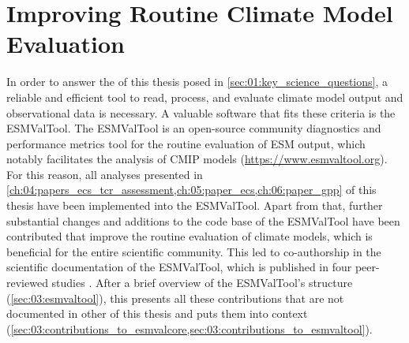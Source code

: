 
%



\chapter{Improving Routine Climate Model Evaluation}
\label{ch:03:esmvaltool}

In order to answer the  of this thesis posed in
\cref{sec:01:key_science_questions}, a reliable and efficient tool to read,
process, and evaluate climate model output and observational data is necessary.
A valuable software that fits these criteria is the \ac{ESMValTool}. The
\ac{ESMValTool} is an open-source community diagnostics and performance metrics
tool for the routine evaluation of \ac{ESM} output, which notably facilitates
the analysis of \ac{CMIP} models (\url{https://www.esmvaltool.org}). For this
reason, all analyses presented in
\cref{ch:04:papers_ecs_tcr_assessment,ch:05:paper_ecs,ch:06:paper_gpp} of this
thesis have been implemented into the \ac{ESMValTool}. Apart from that, further
substantial changes and additions to the code base of the \ac{ESMValTool} have
been contributed that improve the routine evaluation of climate models, which
is beneficial for the entire scientific community. This led to co-authorship in
the scientific documentation of the \ac{ESMValTool}, which is published in four
peer-reviewed studies \autocite{Eyring2020, Lauer2020, Righi2020, Weigel2020}.
After a brief overview of the \ac{ESMValTool}'s structure
(\cref{sec:03:esmvaltool}), this  presents all these
contributions that are not documented in other
 of this thesis and puts them into
context
(\cref{sec:03:contributions_to_esmvalcore,sec:03:contributions_to_esmvaltool}).


